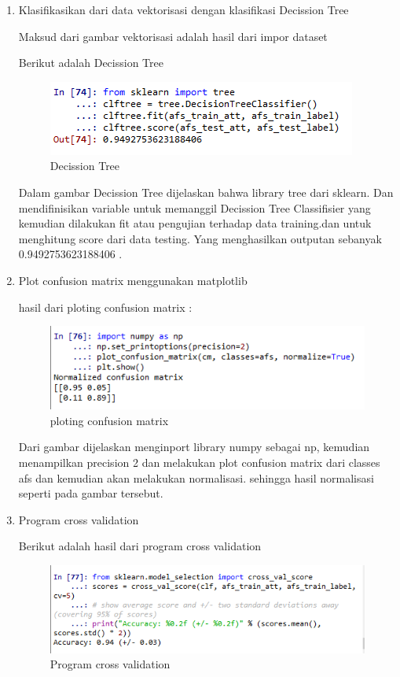 \begin{enumerate}
\item Klasifikasikan dari data vektorisasi dengan klasifikasi Decission Tree
	\par Maksud dari gambar vektorisasi adalah hasil dari impor dataset
	\par Berikut adalah Decission Tree
		\begin{figure}[ht]
		\centering
		\includegraphics[scale=0.5]{figures/AFS/a8.png}
		\caption{Decission Tree}
		\label{contoh}
		\end{figure}
	\par Dalam gambar Decission Tree dijelaskan bahwa library tree dari sklearn. Dan mendifinisikan variable untuk memanggil Decission Tree Classifisier yang kemudian dilakukan fit atau pengujian terhadap data training.dan untuk menghitung score dari data testing. Yang menghasilkan outputan sebanyak 0.9492753623188406 .

\item Plot confusion matrix menggunakan matplotlib
	\par hasil dari ploting confusion matrix :
		\begin{figure}[ht]
		\centering
		\includegraphics[scale=0.5]{figures/AFS/a9.png}
		\caption{ploting confusion matrix}
		\label{contoh}
		\end{figure}
	\par Dari gambar dijelaskan menginport library numpy sebagai np, kemudian menampilkan precision 2 dan melakukan plot confusion matrix dari classes afs dan kemudian akan melakukan normalisasi. sehingga hasil normalisasi seperti pada gambar tersebut.

\item Program cross validation
	\par Berikut adalah hasil dari program cross validation
		\begin{figure}[ht]
		\centering
		\includegraphics[scale=0.5]{figures/AFS/a10.png}
		\caption{Program cross validation}
		\label{contoh}
		\end{figure}
		

\end{enumerate}

